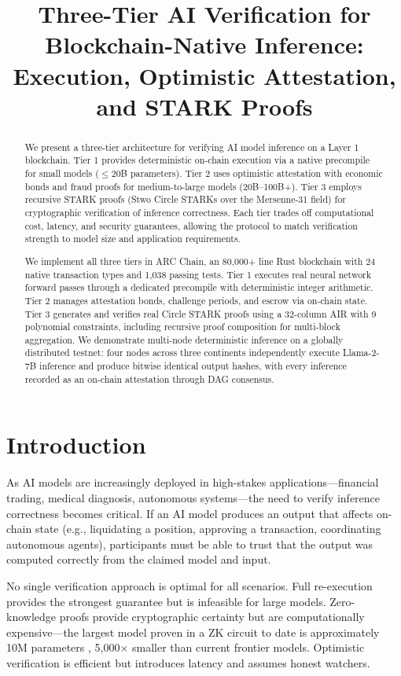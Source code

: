 \documentclass[conference]{IEEEtran}
\title{Three-Tier AI Verification for Blockchain-Native Inference:\\Execution, Optimistic Attestation, and STARK Proofs}
\author{
\IEEEauthorblockN{TJ Dunham}
\IEEEauthorblockA{ARC Network}
}
\begin{document}
\maketitle

\begin{abstract}
We present a three-tier architecture for verifying AI model inference on a Layer 1 blockchain. Tier 1 provides deterministic on-chain execution via a native precompile for small models ($\leq$20B parameters). Tier 2 uses optimistic attestation with economic bonds and fraud proofs for medium-to-large models (20B--100B+). Tier 3 employs recursive STARK proofs (Stwo Circle STARKs over the Mersenne-31 field) for cryptographic verification of inference correctness. Each tier trades off computational cost, latency, and security guarantees, allowing the protocol to match verification strength to model size and application requirements.

We implement all three tiers in ARC Chain, an 80,000+ line Rust blockchain with 24 native transaction types and 1,038 passing tests. Tier 1 executes real neural network forward passes through a dedicated precompile with deterministic integer arithmetic. Tier 2 manages attestation bonds, challenge periods, and escrow via on-chain state. Tier 3 generates and verifies real Circle STARK proofs using a 32-column AIR with 9 polynomial constraints, including recursive proof composition for multi-block aggregation. We demonstrate multi-node deterministic inference on a globally distributed testnet: four nodes across three continents independently execute Llama-2-7B inference and produce bitwise identical output hashes, with every inference recorded as an on-chain attestation through DAG consensus.
\end{abstract}

\section{Introduction}

As AI models are increasingly deployed in high-stakes applications---financial trading, medical diagnosis, autonomous systems---the need to verify inference correctness becomes critical. If an AI model produces an output that affects on-chain state (e.g., liquidating a position, approving a transaction, coordinating autonomous agents), participants must be able to trust that the output was computed correctly from the claimed model and input.

No single verification approach is optimal for all scenarios. Full re-execution provides the strongest guarantee but is infeasible for large models. Zero-knowledge proofs provide cryptographic certainty but are computationally expensive---the largest model proven in a ZK circuit to date is approximately 10M parameters \cite{ezkl}, 5,000$\times$ smaller than current frontier models. Optimistic verification is efficient but introduces latency and assumes honest watchers.
\end{document}
